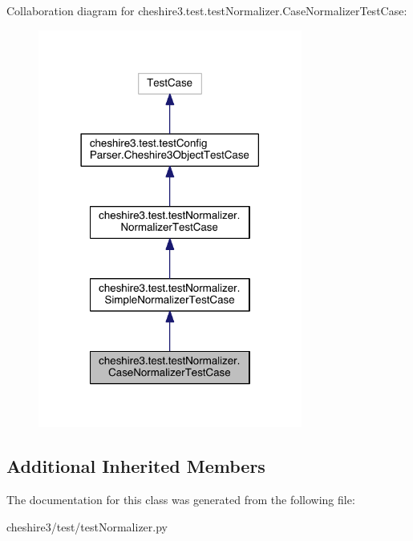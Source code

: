 Collaboration diagram for cheshire3.\-test.\-test\-Normalizer.\-Case\-Normalizer\-Test\-Case\-:
\nopagebreak
\begin{figure}[H]
\begin{center}
\leavevmode
\includegraphics[width=246pt]{classcheshire3_1_1test_1_1test_normalizer_1_1_case_normalizer_test_case__coll__graph}
\end{center}
\end{figure}
\subsection*{Additional Inherited Members}


The documentation for this class was generated from the following file\-:\begin{DoxyCompactItemize}
\item 
cheshire3/test/test\-Normalizer.\-py\end{DoxyCompactItemize}
